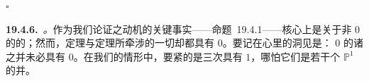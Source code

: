 \begin{flushright}
$\square$
\end{flushright}

\textbf{19.4.6.}\ \emph{\trhRemark{}。}\quad 作为我们论证之动机的关键事实——\mbox{命题~19.4.1}——核心上是关于\trGenus{}非 $0$ 的\trCurve{}的；然而，\trPappus{}定理与\trPascal{}定理所牵涉的一切\trCurve{}却都具有\trGenus{} $0$。要记在心里的洞见是：\trGenus{} $0$ 的诸\trCurve{}之并未必具有\trGenus{} $0$。在我们的情形中，要紧的是三次\trCurve{}具有\trGenus{} $1$，哪怕它们是若干个 $\mathbb{P}^1$ 的并。
